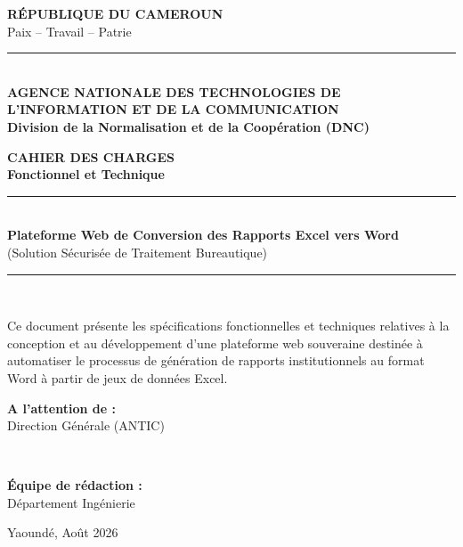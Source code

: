 \documentclass[12pt,a4paper,twoside]{report}
\begin{document}
\begin{titlepage}
    \centering
    \vspace*{1cm}
    
    {\large \textbf{RÉPUBLIQUE DU CAMEROUN}} \\
    {\small Paix -- Travail -- Patrie} \\
    \vspace{0.5cm}
    \rule{4cm}{0.5pt} \\
    \vspace{0.5cm}
    {\large \textbf{AGENCE NATIONALE DES TECHNOLOGIES DE L'INFORMATION ET DE LA COMMUNICATION}} \\
    \vspace{0.2cm}
    {\normalsize \textbf{Division de la Normalisation et de la Coopération (DNC)}} \\
    
    \vspace{4cm}
    
    {\Huge \textbf{\textcolor{anticblue}{CAHIER DES CHARGES}}} \\[0.5cm]
    {\LARGE \textbf{Fonctionnel et Technique}} \\
    \vspace{1cm}
    \rule{\linewidth}{1.5pt} \\[0.5cm]
    {\Huge \textbf{Plateforme Web de Conversion des Rapports Excel vers Word}} \\[0.2cm]
    {\Large (Solution Sécurisée de Traitement Bureautique)}
    \rule{\linewidth}{1.5pt} \\[3cm]
    
    {\flushleft \large Ce document présente les spécifications fonctionnelles et techniques relatives à la conception et au développement d'une plateforme web souveraine destinée à automatiser le processus de génération de rapports institutionnels au format Word à partir de jeux de données Excel.\par}
    
    \vfill
    
    \begin{minipage}{0.45\textwidth}
        \begin{flushleft}
        \textbf{A l'attention de :}\\
        Direction Générale (ANTIC)
        \end{flushleft}
    \end{minipage}
    ~
    \begin{minipage}{0.45\textwidth}
        \begin{flushright}
        \textbf{Équipe de rédaction :}\\
        Département Ingénierie
        \end{flushright}
    \end{minipage}
    
    \vspace{2cm}
    {\normalsize Yaoundé, Août 2026}
\end{titlepage}
\end{document}

